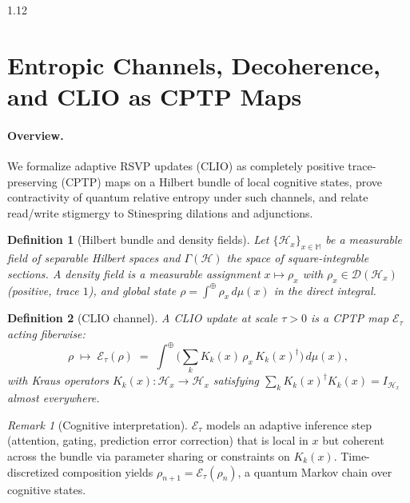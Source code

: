 \documentclass[12pt,a4paper]{article}
\numberwithin{equation}{section}
\newtheorem{definition}{Definition}[section]
\theoremstyle{remark}
\newtheorem{remark}{Remark}[section]
\theoremstyle{definition}
\begin{document}
\begin{spacing}{1.12}
\section{Entropic Channels, Decoherence, and CLIO as CPTP Maps}
\label{sec:decoherence-clio}

\paragraph{Overview.}
We formalize adaptive RSVP updates (CLIO) as completely positive trace-preserving (CPTP) maps on a Hilbert bundle of local cognitive states, prove contractivity of quantum relative entropy under such channels, and relate read/write stigmergy to Stinespring dilations and adjunctions.

\begin{definition}[Hilbert bundle and density fields]
Let $\{\mathcal{H}_x\}_{x\in\mathbb{M}}$ be a measurable field of separable Hilbert spaces and $\Gamma(\mathcal{H})$ the space of square-integrable sections.
A \emph{density field} is a measurable assignment $x\mapsto \rho_x$ with $\rho_x\in\mathcal{D}(\mathcal{H}_x)$ (positive, trace $1$), and global state $\rho=\int^\oplus \rho_x\,d\mu(x)$ in the direct integral.
\end{definition}

\begin{definition}[CLIO channel]
A \emph{CLIO update} at scale $\tau>0$ is a CPTP map $\mathcal{E}_\tau$ acting fiberwise:
\begin{equation}
\label{eq:CLIO-CPTP}
\rho\;\mapsto\;\mathcal{E}_\tau(\rho)\;=\;\int^\oplus\!\Big(\sum_{k} K_{k}(x)\,\rho_x\,K_{k}(x)^\dagger\Big)\,d\mu(x),
\end{equation}
with Kraus operators $K_{k}(x):\mathcal{H}_x\to\mathcal{H}_x$ satisfying $\sum_k K_{k}(x)^\dagger K_{k}(x)=I_{\mathcal{H}_x}$ almost everywhere.
\end{definition}

\begin{remark}[Cognitive interpretation]
$\mathcal{E}_\tau$ models an adaptive inference step (attention, gating, prediction error correction) that is local in $x$ but coherent across the bundle via parameter sharing or constraints on $K_k(x)$. Time-discretized composition yields $\rho_{n+1}=\mathcal{E}_\tau(\rho_n)$, a quantum Markov chain over cognitive states.
\end{remark}


\end{spacing}
\end{document}
